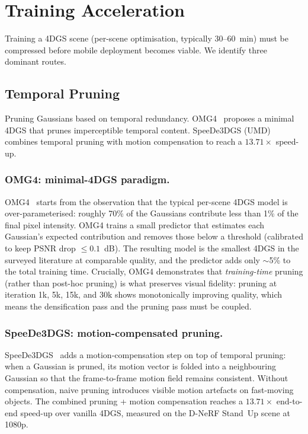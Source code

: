 
\section{Training Acceleration}
\label{sec:training}

Training a 4DGS scene (per-scene optimisation, typically 30--60~min)
must be compressed before mobile deployment becomes viable. We
identify three dominant routes.

\subsection{Temporal Pruning}
Pruning Gaussians based on temporal redundancy. OMG4~\cite{lee2025omg4}
proposes a minimal 4DGS that prunes imperceptible temporal content.
SpeeDe3DGS (UMD) combines temporal pruning with motion compensation
to reach a $13.71\times$ speed-up.

\subsubsection{OMG4: minimal-4DGS paradigm.}
OMG4~\cite{lee2025omg4} starts from the observation that the
typical per-scene 4DGS model is over-parameterised: roughly 70\%
of the Gaussians contribute less than 1\% of the final pixel
intensity. OMG4 trains a small predictor that estimates each
Gaussian's expected contribution and removes those below a
threshold (calibrated to keep PSNR drop $\le 0.1$~dB). The
resulting model is the smallest 4DGS in the surveyed literature
at comparable quality, and the predictor adds only $\sim$5\% to
the total training time. Crucially, OMG4 demonstrates that
\emph{training-time} pruning (rather than post-hoc pruning) is
what preserves visual fidelity: pruning at iteration 1k, 5k,
15k, and 30k shows monotonically improving quality, which means
the densification pass and the pruning pass must be coupled.

\subsubsection{SpeeDe3DGS: motion-compensated pruning.}
SpeeDe3DGS~\cite{tu2025speede3dgs} adds a motion-compensation
step on top of temporal pruning: when a Gaussian is pruned, its
motion vector is folded into a neighbouring Gaussian so that the
frame-to-frame motion field remains consistent. Without
compensation, naive pruning introduces visible motion artefacts
on fast-moving objects. The combined pruning + motion
compensation reaches a $13.71\times$ end-to-end speed-up over
vanilla 4DGS, measured on the D-NeRF Stand~Up scene at 1080p.

